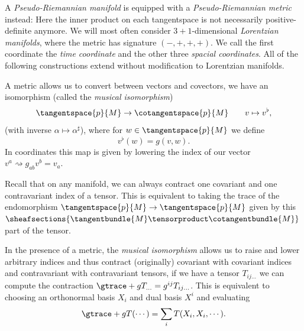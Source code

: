 \documentclass[titlepage,numbers=noenddot,headinclude,oneside,%
footinclude=true,cleardoublepage=empty,%
BCOR=5mm,paper=a4,fontsize=11pt,%
english,%
]{scrartcl}
\begin{document}
\begin{remark}
    A \emph{Pseudo-Riemannian manifold} is equipped with a \emph{Pseudo-Riemannian metric} instead: Here the inner product on each tangentspace is not necessarily positive-definite anymore. We will most often consider \( 3+1 \)-dimensional \emph{Lorentzian manifolds}, where the metric has signature \( (-,+,+,+) \). We call the first coordinate the \emph{time coordinate} and the other three \emph{spacial coordinates}. All of the following constructions extend without modification to Lorentzian manifolds.
\end{remark}
\begin{remark}
    A metric allows us to convert between vectors and covectors, \ie we have an isomorphism (called the \emph{musical isomorphism})
    \begin{equation*}
        \tangentspace{p}{M}\to \cotangentspace{p}{M}\qquad v\mapsto v^\flat,
    \end{equation*}
    (with inverse \( \alpha\mapsto \alpha^{\sharp} \)), where for \( w\in \tangentspace{p}{M} \) we define
    \begin{equation*}
        v^{\flat}(w)=g(v,w).
    \end{equation*}
    In coordinates this map is given by lowering the index of our vector \ie \( v^a\rightsquigarrow g_{ab}v^b=v_a \).
\end{remark}
\begin{remark}
    Recall that on any manifold, we can always contract one covariant and one contravariant index of a tensor. This is equivalent to taking the trace of the endomorphism \( \tangentspace{p}{M}\to \tangentspace{p}{M} \) given by this \( \sheafsections{\tangentbundle{M}\tensorproduct \cotangentbundle{M}} \) part of the tensor.
    
    In the presence of a metric, the \emph{musical isomorphism} allows us to raise and lower arbitrary indices and thus contract (originally) covariant with covariant indices and contravariant with contravariant tensors, \ie if we have a tensor \( T_{ij\dotsc} \) we can compute the contraction \( \gtrace+{g}{T}_{\dotsc}=g^{ij}T_{ij\dotsc} \). This is equivalent to choosing an orthonormal basis \( X_i \) and dual basis \( X^i \) and evaluating
    \begin{equation*}
        \gtrace+{g}{T}(\cdots)=\sum_{i}T(X_i,X_i,\cdots).
    \end{equation*}
\end{remark}
\end{document}
